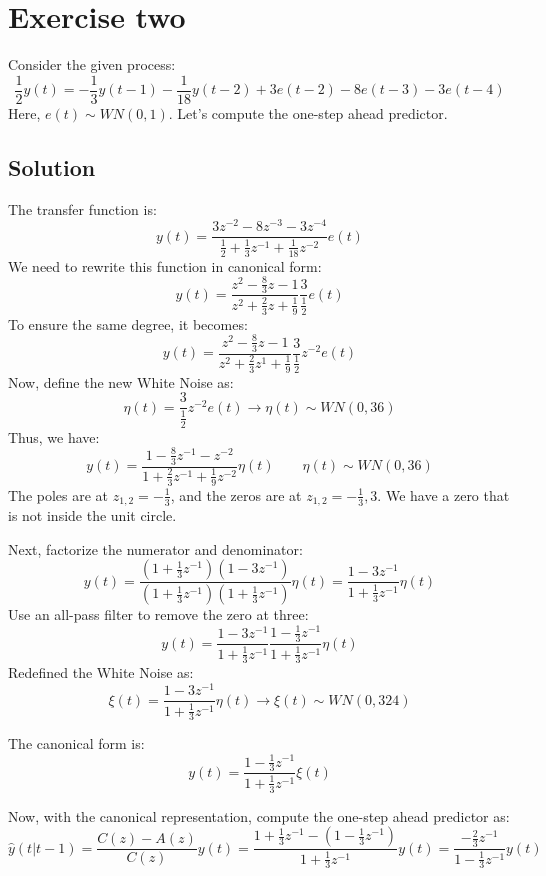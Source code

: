 \section{Exercise two}

Consider the given process:
\[\dfrac{1}{2}y(t)=-\dfrac{1}{3}y(t-1)-\dfrac{1}{18}y(t-2)+3e(t-2)-8e(t-3)-3e(t-4)\]
Here, $e(t)\sim WN(0,1)$. 
Let's compute the one-step ahead predictor.

\subsection*{Solution}
The transfer function is:
\[y(t)=\dfrac{3z^{-2}-8z^{-3}-3z^{-4}}{\frac{1}{2}+\frac{1}{3}z^{-1}+\frac{1}{18}z^{-2}}e(t)\]
We need to rewrite this function in canonical form:
\[y(t)=\dfrac{z^{2}-\frac{8}{3}z-1}{z^2+\frac{2}{3}z+\frac{1}{9}}\frac{3}{\frac{1}{2}}e(t)\]
To ensure the same degree, it becomes:
\[y(t)=\dfrac{z^{2}-\frac{8}{3}z-1}{z^2+\frac{2}{3}z^1+\frac{1}{9}}\frac{3}{\frac{1}{2}}z^{-2}e(t)\]
Now, define the new White Noise as:
\[\eta(t)=\frac{3}{\frac{1}{2}}z^{-2}e(t)\rightarrow \eta(t)\sim WN\left(0,36\right)\]
Thus, we have:
\[y(t)=\dfrac{1-\frac{8}{3}z^{-1}-z^{-2}}{1+\frac{2}{3}z^{-1}+\frac{1}{9}z^{-2}}\eta(t) \qquad \eta(t)\sim WN\left(0,36\right)\]
The poles are at $z_{1,2}=-\frac{1}{3}$, and the zeros are at $z_{1,2}=-\frac{1}{3},3$. 
We have a zero that is not inside the unit circle.

Next, factorize the numerator and denominator:
\[y(t)=\dfrac{\left(1+\frac{1}{3}z^{-1}\right)\left(1-3z^{-1}\right)}{\left(1+\frac{1}{3}z^{-1}\right)\left(1+\frac{1}{3}z^{-1}\right)}\eta(t)=\dfrac{1-3z^{-1}}{1+\frac{1}{3}z^{-1}}\eta(t) \]
Use an all-pass filter to remove the zero at three:
\[y(t)=\dfrac{1-3z^{-1}}{1+\frac{1}{3}z^{-1}}\dfrac{1-\frac{1}{3}z^{-1}}{1+\frac{1}{3}z^{-1}}\eta(t)\]
Redefined the White Noise as:
\[\xi(t)=\dfrac{1-3z^{-1}}{1+\frac{1}{3}z^{-1}}\eta(t)\rightarrow \xi(t)\sim WN(0,324)\]

The canonical form is:
\[y(t)=\dfrac{1-\frac{1}{3}z^{-1}}{1+\frac{1}{3}z^{-1}}\xi(t)\]

Now, with the canonical representation, compute the one-step ahead predictor as:
\[\hat{y}(t|t-1)=\dfrac{C(z)-A(z)}{C(z)}y(t)=\dfrac{1+\frac{1}{3}z^{-1}-\left(1-\frac{1}{3}z^{-1}\right)}{1+\frac{1}{3}z^{-1}}y(t)=\dfrac{-\frac{2}{3}z^{-1}}{1-\frac{1}{3}z^{-1}}y(t)\]